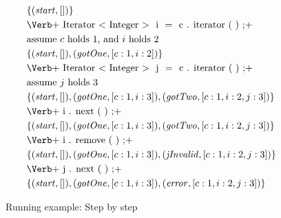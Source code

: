 \documentclass[preprint]{sigplanconf} %
\theoremstyle{definition}
\begin{document}
\begin{figure}
\begin{align*}
&\{(\mathit{start}, [])\} \\
&\text{\Verb+\PY{n}{Iterator}\PY{o}{<}\PY{n}{Integer}\PY{o}{>} \PY{n}{i} \PY{o}{=} \PY{n}{c}\PY{o}{.}\PY{n+na}{iterator}\PY{o}{(}\PY{o}{)}\PY{o}{;}+} \\
&\text{assume $c$ holds $1$, and $i$ holds $2$ } \\
&\{(\mathit{start},[]), (\mathit{gotOne},[c:1, i:2])\} \\
&\text{\Verb+\PY{n}{Iterator}\PY{o}{<}\PY{n}{Integer}\PY{o}{>} \PY{n}{j} \PY{o}{=} \PY{n}{c}\PY{o}{.}\PY{n+na}{iterator}\PY{o}{(}\PY{o}{)}\PY{o}{;}+}\\
&\text{assume $j$ holds $3$} \\
&\{(\mathit{start},[]), (\mathit{gotOne},[c:1,i:3]),(\mathit{gotTwo},[c:1,i:2,j:3])\} \\
&\text{\Verb+\PY{n}{i}\PY{o}{.}\PY{n+na}{next}\PY{o}{(}\PY{o}{)}\PY{o}{;}+} \\
&\{(\mathit{start},[]), (\mathit{gotOne},[c:1,i:3]),(\mathit{gotTwo},[c:1,i:2,j:3])\}\\
&\text{\Verb+\PY{n}{i}\PY{o}{.}\PY{n+na}{remove}\PY{o}{(}\PY{o}{)}\PY{o}{;}+} \\
&\{(\mathit{start},[]), (\mathit{gotOne},[c:1,i:3]),(\mathit{jInvalid},[c:1,i:2,j:3])\} \\
&\text{\Verb+\PY{n}{j}\PY{o}{.}\PY{n+na}{next}\PY{o}{(}\PY{o}{)}\PY{o}{;}+}\\
&\{(\mathit{start},[]), (\mathit{gotOne},[c:1,i:3]), (\mathit{error},[c:1,i:2,j:3])\}
\end{align*}
\caption{Running example: Step by step}
\label{fig:running.steps}
\end{figure} %
\end{document}
